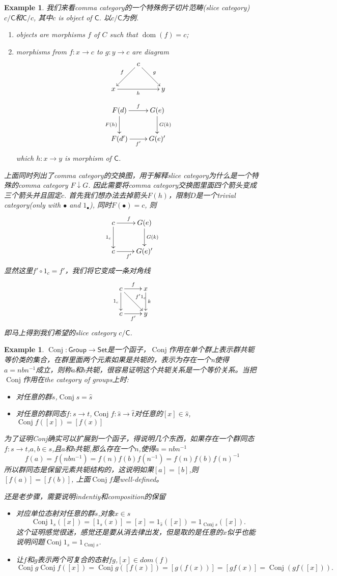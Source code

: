 \documentclass{article}
\newtheorem{example}[theorem]{Example}
\newcommand*{\cat}[1]{\textsf{#1}\xspace}
\newcommand{\Set}{\textsf{Set}\xspace}
\newcommand{\Group}{\textsf{Group}\xspace}
\newcommand{\sC}{\mathsf{C}}
\newcommand*{\xfunc}[4]{{#2}\colon{#3}{#1}{#4}}
\newcommand*{\func}[3]{\xfunc{\to}{#1}{#2}{#3}}
\DeclareMathOperator{\dom}{dom}
\DeclareMathOperator{\Conj}{Conj}
\begin{document}
\begin{example}
\rm 我们来看comma category的一个特殊例子切片范畴(slice category) $c/\sC$和$\sC/c$, 其中$c$ is object of $\cat{C}$. 以$c/\cat{C}$为例.
\begin{enumerate}
	\item objects are morphisms $f$ of $C$ such that $\dom(f) = c$; 
	\item morphisms from $f:x \to c$ to $g: y \to c$ are diagram
	\[ \xymatrix{&c\ar[dr]^g
		\ar[dl]_f& \\ x \ar[rr]_h && y } \] \[\xymatrix{
					F(d) \ar[d]_{F(h)} \ar[r]^{f} & G(e)\ar[d]^{G(k)}  \\
			F(d')\ar[r]_{f'} &G(e)'}\]
	which $h: x\to y$ is morphism of $\cat{C}$.		
\end{enumerate}

上面同时列出了comma category的交换图，用于解释slice category为什么是一个特殊的comma category $F \downarrow G$. 因此需要将comma category交换图里面四个箭头变成三个箭头并且固定$c$. 首先我们想办法去掉箭头$F(h)$，限制$D$是一个trivial category(only with $\bullet$ and $1_\bullet$), 同时$F(\bullet) = c$, 则 \[\xymatrix{c \ar[d]_{1_c} \ar[r]^{f} & G(e)\ar[d]^{G(k)}  \\c\ar[r]_{f'} &G(e)'}\] 显然这里$f' \circ 1_c = f'$，我们将它变成一条对角线\[\xymatrix{c \ar[d]_{1_c} \ar[r]^{f} \ar[rd]^{f'1_c} & x\ar[d]^{k}  \\c\ar[r]_{f'} &y}\] 即马上得到我们希望的slice category $c/\cat{C}$.  
\end{example}

\begin{example}
\rm $\func{\Conj}{\Group}{\Set}$是一个函子，$\Conj$作用在单个群上表示群共轭等价类的集合，在群里面两个元素如果是共轭的，表示为存在一个n使得$a=nbn^{-1}$成立，则称$a$和$b$共轭，很容易证明这个共轭关系是一个等价关系。当把$\Conj$作用在\emph{the category of groups}上时:
	\begin{itemize}
		\item 对任意的群$s$,\(\Conj s = \hat{s}\)
		\item 对任意的群同态\(\func{f}{s}{t}\),\(\func{\Conj f}{\hat{s}}{\hat{t}}\)对任意的\([x] \in \hat{s}\),\(\Conj f([x])=[f(x)]\)
	\end{itemize}
	
为了证明Conj确实可以扩展到一个函子，得说明几个东西，如果存在一个群同态$\func{f}{s}{t}$,$a,b \in s$,且$a$和$b$共轭,那么存在一个$n$,使得$a=nbn^{-1}$ \[f(a)=f(nbn^{-1})=f(n)f(b)f(n^{-1})=f(n)f(b)f(n)^{-1}\]所以群同态是保留元素共轭结构的，这说明如果$[a]=[b]$,则$[f(a)]=[f(b)]$, 上面$\Conj f$是well-defined。

还是老步骤，需要说明indentiy和composition的保留
\begin{itemize}
	\item 对应单位态射对任意的群$s$,对象$x \in s$ \[\Conj 1_s([x])=[1_s(x)]=[x]=1_{\hat{s}}([x])=1_{\Conj s}([x]).\]这个证明感觉很迷，感觉还是要从消去律出发，但是取的是任意的$x$似乎也能说明问题$\Conj 1_s = 1_{\Conj s}$.
	\item 让$f$和$g$表示两个可复合的态射$fg$,$[x] \in dom(f)$ \[\Conj g\Conj f([x])=\Conj g([f(x)])=[g(f(x))]=[gf(x)]=\Conj (gf([x])).\]
\end{itemize}	
\end{example}
\end{document}
